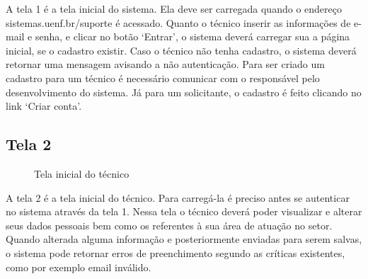A tela 1 é a tela inicial do sistema. Ela deve ser carregada quando o endereço sistemas.uenf.br/suporte é acessado. Quanto o técnico inserir as informações de e-mail e senha, e clicar no botão ‘Entrar’, o sistema deverá carregar sua a página inicial, se o cadastro existir. Caso o técnico não tenha cadastro, o sistema deverá retornar uma mensagem avisando a não autenticação. Para ser criado um cadastro para um técnico é necessário comunicar com o responsável pelo desenvolvimento do sistema. Já para um solicitante, o cadastro é feito clicando no link ‘Criar conta’.

\newpage

\subsection{Tela 2}

\begin{figure}[ht]
    \centering
    \caption{Tela inicial do técnico}
\end{figure}

A tela 2 é a tela inicial do técnico. Para carregá-la é preciso antes se autenticar no sistema através da tela 1. Nessa tela o técnico deverá poder visualizar e alterar seus dados pessoais bem como os referentes à sua área de atuação no setor. Quando alterada alguma informação e posteriormente enviadas para serem salvas, o sistema pode retornar erros de preenchimento segundo as críticas existentes, como por exemplo email inválido. 

